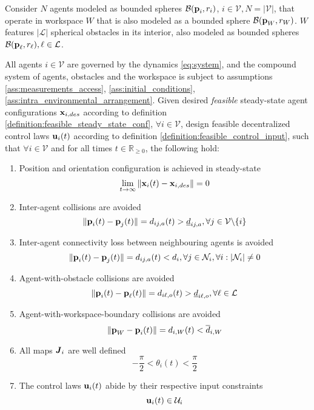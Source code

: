 \begin{bg_box}
\label{problem}
\begin{problem}
  Consider $N$ agents modeled as bounded spheres $\mathcal{B}(\bm{\mathbf{p}}_i, r_i)$,
  $i \in \mathcal{V}, N = |\mathcal{V}|$, that operate in workspace $W$ that is
  also modeled as a bounded sphere $\mathcal{B}(\bm{\mathbf{p}}_W,r_W)$. $W$
  features $|\mathcal{L}|$ spherical obstacles in its interior, also modeled as
  bounded spheres $\mathcal{B}(\bm{\mathbf{p}}_{\ell}, r_{\ell}), \ell \in \mathcal{L}$.

  All agents $i \in \mathcal{V}$ are governed by the dynamics \eqref{eq:system},
  and the compound system of agents, obstacles and the workspace is subject to
  assumptions \eqref{ass:measurements_access}, \eqref{ass:initial_conditions},
  \eqref{ass:intra_environmental_arrangement}. Given desired \textit{feasible}
  steady-state agent configurations $\bm{\mathbf{x}}_{i,des}$ according to definition
  \eqref{definition:feasible_steady_state_conf},
  $\forall i \in \mathcal{V}$, design feasible decentralized control laws
  $\bm{\mathbf{u}}_i(t)$ according to definition \eqref{definition:feasible_control_input},
  such that $\forall i \in \mathcal{V}$ and for all times $t \in \mathbb{R}_{\geq 0}$,
  the following hold:

  \begin{enumerate}

    \item Position and orientation configuration is achieved in steady-state
      $$\lim_{t \to \infty} \|\bm{\mathbf{x}}_i(t) - \bm{\mathbf{x}}_{i,des}\| = 0$$

    \item Inter-agent collisions are avoided
      $$\|\bm{\mathbf{p}}_i(t) - \bm{\mathbf{p}}_j(t)\| = d_{ij,a}(t) > \underline{d}_{ij,a},
      \forall j \in \mathcal{V} \backslash \{i\}$$

    \item Inter-agent connectivity loss between neighbouring agents is avoided
      $$ \|\bm{\mathbf{p}}_i(t) - \bm{\mathbf{p}}_j(t)\| = d_{ij,a} (t) < d_i,
      \forall j \in \mathcal{N}_i, \forall i : |\mathcal{N}_i| \not= 0$$

    \item Agent-with-obstacle collisions are avoided
      $$ \|\bm{\mathbf{p}}_i(t) - \bm{\mathbf{p}}_{\ell}(t)\| = d_{i\ell,o} (t) > \underline{d}_{i\ell,o},
      \forall \ell \in \mathcal{L}$$

    \item Agent-with-workspace-boundary collisions are avoided
      $$ \|\bm{\mathbf{p}}_W - \bm{\mathbf{p}}_i(t)\| = d_{i,W} (t) < \overline{d}_{i,W}$$

    \item All maps $\bm{\mathit{J}}_i$ are well defined
      $$- \frac{\pi}{2} < \theta_i(t) < \frac{\pi}{2}$$

    \item The control laws $\bm{\mathbf{u}}_i(t)$ abide by their respective input constraints
      $$\bm{\mathbf{u}}_i(t) \in \mathcal{U}_i$$

  \end{enumerate}
\end{problem}
\end{bg_box}
